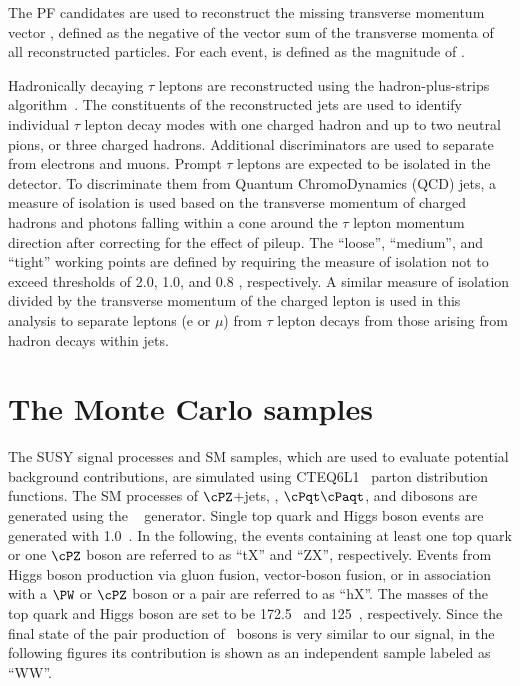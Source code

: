 The PF candidates are used to reconstruct the missing transverse momentum  vector \ptvecmiss, 
defined as the negative of the vector sum of the transverse momenta of all reconstructed particles.  
For each event, \MPT is defined as the magnitude of \ptvecmiss.

Hadronically decaying $\tau$ leptons are reconstructed using the hadron-plus-strips algorithm~\cite{Khachatryan:2015dfa}.
The constituents of the reconstructed jets are used to identify individual $\tau$ lepton decay modes with one charged 
hadron and up to two neutral pions, or three charged hadrons. 
Additional discriminators are used to separate \Tau from electrons and muons.
Prompt $\tau$ leptons are expected to be isolated in the detector.
To discriminate them from Quantum ChromoDynamics (QCD) jets, a measure of isolation \cite{Khachatryan:2014wca} is used 
based on the transverse momentum of charged hadrons and photons falling within 
a cone around the $\tau$ lepton momentum direction after correcting for the effect of
pileup. The ``loose'', ``medium'', and ``tight'' working points are defined
by requiring the measure of isolation not to exceed thresholds of 2.0, 1.0,
and 0.8 \GeV, respectively.
 A similar measure of isolation divided by the transverse momentum of the charged lepton is 
used in this analysis to separate leptons (e or $\mu$) from $\tau$ lepton decays from 
those arising from hadron decays within jets.

\section{The Monte Carlo samples}
\label{sect:MCSamples}
The SUSY signal processes and SM samples, which are used to evaluate potential background contributions, are simulated using CTEQ6L1~\cite{Nadolsky:2008zw} parton distribution functions. The SM processes of $\cPZ$+jets, \wjets, $\cPqt\cPaqt$, and dibosons are generated using the ~\cite{Alwall:2011uj} generator. 
Single top quark and Higgs boson events are generated with {\POWHEG} 1.0~\cite{Nason:2004rx,Frixione:2007vw,Alioli:2009je,Alioli:2010xd}.
In the following, the events containing at least one top quark or one $\cPZ$ boson are referred to as ``tX'' and ``ZX'', respectively. 
Events from Higgs boson production via gluon fusion, vector-boson fusion, or in association with a $\PW$ or $\cPZ$  boson or a \ttbar pair are referred to as ``hX''. The masses of the top quark and Higgs boson are set to be 172.5\GeV~\cite{Khachatryan:2015hba} and 125\GeV~\cite{Aad:2015zhl}, respectively. Since the 
final state of the pair production of \PW~bosons is very similar to our signal, in the following figures its contribution is shown as an independent sample 
labeled as ``WW''.

